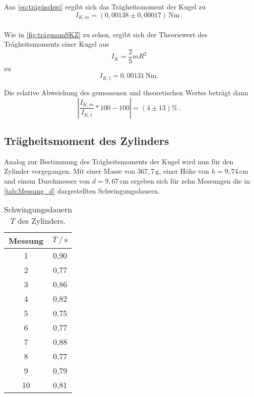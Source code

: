 Aus \eqref{eq:trägüschwi} ergibt sich das Trägheitsmoment der Kugel zu
\begin{equation*}
  I_{K,m} = (0,00138 \pm 0,00017)\, \unit{\newton\meter}  \, .
\end{equation*} \\

Wie in \autoref{fig:trägmomSKZ} zu sehen, ergibt sich der Theoriewert des Trägheitsmoments einer Kugel aus
\begin{equation}
  I_{K} = \frac{2}{5} m R^2
  \label{trägheitsmomK}
\end{equation}
zu
\begin{equation*}
  I_{K,t} = 0,00131 \, \unit{\newton\meter}. %
\end{equation*}

Die relative Abweichung des gemessenen und theoretischen Wertes beträgt dann
\begin{equation*}
  \left|\frac{I_{K,m}}{I_{K,t}} * 100 - 100 \right| = (4 \pm 13) \% \,. %
\end{equation*}



\subsection{Trägheitsmoment des Zylinders}
\label{subsec:d}

Analog zur Bestimmung des Trägheitsmoments der Kugel wird nun für den Zylinder vorgegangen. Mit einer Masse von $367,7 \,\unit{\gram}$, einer Höhe von $h = 9,74 \,\unit{\centi\meter}$
und einem Durchmesser von $d = 9,67 \,\unit{\centi\meter}$ ergeben sich für zehn Messungen die in \autoref{tab:Messung_d} dargestellten Schwingungsdauern.

\begin{table}[H] %
  \centering
  \begin{tabular}{S[table-format=2.0] S[table-format=1.2]}
      \toprule
      {Messung} & {$T \mathbin{/} \unit{\second}$}\\
        & 0,90 \\
          2  & 0,77 \\
          3  & 0,86 \\
          4  & 0,82 \\  
          5  & 0,75 \\
          6  & 0,77 \\
          7  & 0,88 \\
          8  & 0,77 \\
          9  & 0,79 \\
          10 & 0,81 \\
      \bottomrule
  \end{tabular}
  \caption{Schwingungsdauern $T$ des Zylinders.}
  \label{tab:Messung_d}
\end{table}

